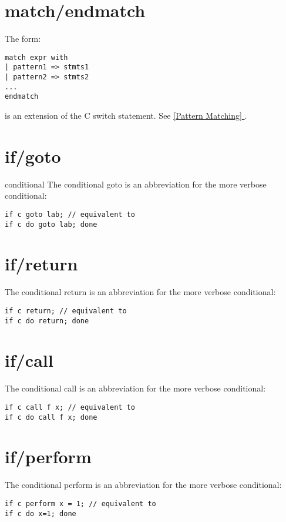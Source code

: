\documentclass[oneside]{book}
\newcommand*{\fullref}[1]{\hyperref[{#1}]{\autoref*{#1} \nameref*{#1}}}
\begin{document}
\section{match/endmatch}
The form:

\begin{verbatim}
match expr with
| pattern1 => stmts1
| pattern2 => stmts2
...
endmatch
\end{verbatim}

is an extension of the C switch statement. See \fullref{Pattern Matching}.

\section{if/goto}{conditional}
The conditional goto is an abbreviation for 
the more verbose conditional:

\begin{verbatim}
if c goto lab; // equivalent to
if c do goto lab; done
\end{verbatim}


\section{if/return}
The conditional return is an abbreviation for
the more verbose conditional:

\begin{verbatim}
if c return; // equivalent to
if c do return; done
\end{verbatim}


\section{if/call}
The conditional call is an abbreviation for
the more verbose conditional:

\begin{verbatim}
if c call f x; // equivalent to
if c do call f x; done
\end{verbatim}

\section{if/perform}
The conditional perform is an abbreviation for
the more verbose conditional:

\begin{verbatim}
if c perform x = 1; // equivalent to
if c do x=1; done
\end{verbatim}
\end{document}
